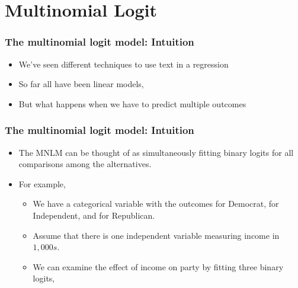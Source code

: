 \documentclass[
  shownotes,
  xcolor={svgnames},
  hyperref={colorlinks,citecolor=DarkBlue,linkcolor=DarkRed,urlcolor=DarkBlue}
  , aspectratio=169]{beamer}
\begin{document}
\section{Multinomial Logit}

\begin{frame}[fragile]
\frametitle{The multinomial logit model: Intuition}

\begin{itemize}
 \item We've seen different techniques to use text in a regression
 \medskip
 \item So far all have been linear models,
 \medskip
 \item But what happens when we have to predict multiple outcomes 
\end{itemize}





\end{frame}
\begin{frame}[fragile]
\frametitle{The multinomial logit model: Intuition}



\begin{itemize}
 \item The MNLM can be thought of as simultaneously fitting binary logits for all comparisons among the alternatives. 
\medskip
 \item For example, 
 \medskip
\begin{itemize}
    \item We have  a categorical variable with the outcomes for Democrat, for Independent, and for Republican.
      \medskip
    \item Assume that there is one independent variable measuring income in $1,000s$. 
      \medskip
    \item We can examine the effect of income on party by fitting three binary logits,
\end{itemize}
 

\end{itemize}

\end{frame}
\end{document}
